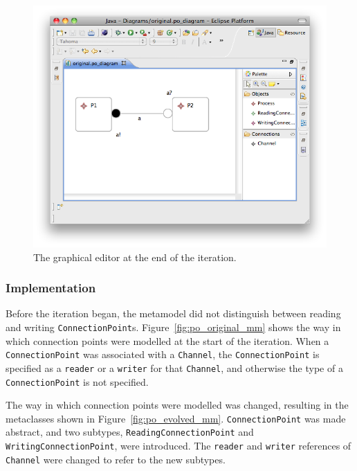 \begin{figure}[htbp]
	\centering
	\includegraphics[width=13.5cm]{6.Evaluation/images/user_driven/po_evolved_editor.png}
	\caption{The graphical editor at the end of the iteration.}
	\label{fig:po_evolved_editor}
\end{figure}


\subsubsection{Implementation}
Before the iteration began, the metamodel did not distinguish between reading and writing \texttt{Co\-nn\-ec\-ti\-o\-nPo\-i\-nt}s. Figure~\ref{fig:po_original_mm} shows the way in which connection points were modelled at the start of the iteration. When a \texttt{Co\-nn\-ec\-ti\-o\-nPo\-i\-nt} was associated with a \texttt{Ch\-an\-nel}, the  \texttt{Co\-nn\-ec\-ti\-o\-nPo\-i\-nt} is specified as a \texttt{re\-ad\-er} or a \texttt{wr\-it\-er} for that \texttt{Ch\-an\-nel}, and otherwise the type of a \texttt{Co\-nn\-ec\-ti\-o\-nPo\-i\-nt} is not specified.

The way in which connection points were modelled was changed, resulting in the metaclasses shown in Figure~\ref{fig:po_evolved_mm}. \texttt{Co\-nn\-ec\-ti\-o\-nPo\-i\-nt} was made abstract, and two subtypes, \texttt{Re\-ad\-i\-ngCo\-nn\-ec\-ti\-o\-nPo\-i\-nt} and \texttt{Wr\-i\-ti\-ngCo\-nn\-ec\-ti\-o\-nPo\-i\-nt}, were introduced. The \texttt{re\-ad\-er} and \texttt{wr\-it\-er} references of \texttt{Ch\-an\-n\-el} were changed to refer to the new subtypes.

